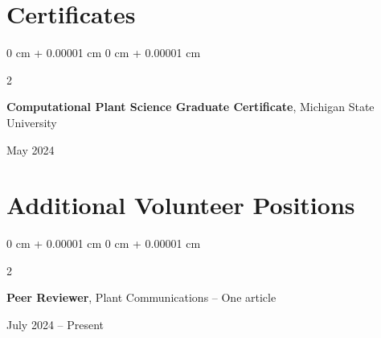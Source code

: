 \documentclass[10pt, letterpaper]{article}
\newenvironment{onecolentry}{
    \begin{adjustwidth}{
        0 cm + 0.00001 cm
    }{
        0 cm + 0.00001 cm
    }
}{
    \end{adjustwidth}
} %
\newenvironment{twocolentry}[2][]{
    \onecolentry
    \def\secondColumn{#2}
    \setcolumnwidth{\fill, 4.5 cm}
    \begin{paracol}{2}
}{
    \switchcolumn \raggedleft \secondColumn
    \end{paracol}
    \endonecolentry
} %
\begin{document}
       
%        
%
%
%            
%
%                




    \section{Certificates}




        \begin{samepage} 
            \begin{twocolentry}{
                May 2024
                }
                \textbf{Computational Plant Science Graduate Certificate}, Michigan State University
            \end{twocolentry}
        \end{samepage}  




    \section{Additional Volunteer Positions}




        \begin{samepage} 
            \begin{twocolentry}{
                July 2024 – Present
                }
                \textbf{Peer Reviewer}, Plant Communications -- One article
            \end{twocolentry}
        \end{samepage} 


        \vspace{0.2 cm} 
\end{document}
